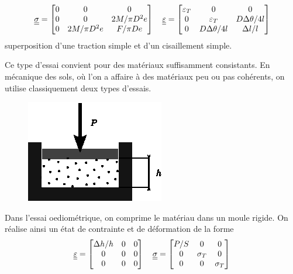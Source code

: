 \begin{equation}
    \underline{\underline{\sigma}} =
    \begin{bmatrix}
        0 & 0 & 0 \\
        0 & 0 & 2M/\pi D^2 e \\
        0 & 2M/\pi D^2 e & F/\pi D e
    \end{bmatrix}
    \quad
    \underline{\underline{\varepsilon}} = 
    \begin{bmatrix}
        \varepsilon_T & 0 & 0 \\
        0 & \varepsilon_T & D \Delta \theta / 4 l \\
        0 & D \Delta \theta / 4 l & \Delta l/l
    \end{bmatrix}
    \label{eq:Ch04-036}
\end{equation}
superposition d'une traction simple et d'un cisaillement simple.

Ce type d'essai convient pour des matériaux suffisamment consistants.
En mécanique des sols, où l'on a affaire à des matériaux peu ou pas cohérents, on utilise classiquement deux types d'essais.

\begin{figure}
    \begin{center}
        \includegraphics{../images/T1_Ch04-0009}
    \end{center}
\end{figure}
Dans l'essai oediométrique, on comprime le matériau dans un moule rigide.
On réalise ainsi un état de contrainte et de déformation de la forme
\begin{equation}
    \underline{\underline{\varepsilon}} =
    \begin{bmatrix}
        \Delta h/h & 0 & 0 \\
        0 & 0 & 0 \\
        0 & 0 & 0
    \end{bmatrix}
    \quad
    \underline{\underline{\sigma}} = 
    \begin{bmatrix}
        P/S & 0 & 0 \\
        0 & \sigma_T & 0 \\
        0 & 0 & \sigma_T
    \end{bmatrix}
    \label{eq:Ch04-037}
\end{equation}

